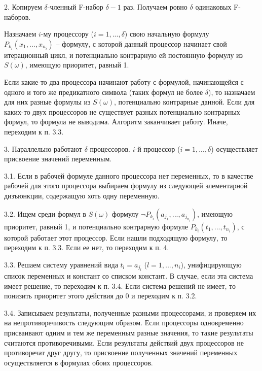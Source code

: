 \documentclass{spisok-article}
\begin{document}
2. Копируем $\delta$-членный F-набор $\delta -1$ раз. Получаем ровно $\delta$ одинаковых F-наборов.

Назначаем $i$-му процессору ($i=1,...,\delta$) свою начальную формулу  $P_{k_i}( x_1, ..., x_{n_i})$ -- формулу, с которой данный процессор начинает свой итерационный цикл, и потенциально контрарную ей постоянную формулу из $S(\omega)$, имеющую приоритет, равный 1.

Если какие-то два процессора начинают работу с формулой, начинающейся с одного и того же предикатного символа  (таких формул не более $\delta$), то назначаем для них разные формулы  из $S(\omega)$, потенциально контрарные данной. Если для каких-то двух процессоров не существует разных потенциально контрарных формул, то формула не выводима. Алгоритм заканчивает работу. Иначе, переходим к п. 3.3.

3. Параллельно работают $\delta$ процессоров. $i$-й процессор ($i=1,...,\delta$) осуществляет присвоение значений переменным.

\hspace*{12pt}
 3.1. Если в рабочей формуле данного процессора нет переменных, то в качестве рабочей для этого процессора выбираем  формулу из следующей элементарной дизъюнкции, содержащую хоть одну переменную.


\hspace*{12pt}
 3.2. Ищем среди формул в $ S(\omega)$ формулу $\lnot P_{k_i}( a_{j_1}, ..., a_{j_{n_i}})$, имеющую приоритет, равный 1, и потенциально контрарную формуле $P_{k_i}( t_1, ..., t_{n_i})$, с которой работает этот процессор.  Если нашли подходящую формулу, то переходим к п. 3.3. Если ее нет, то переходим к п. 4.

\hspace*{12pt} 3.3. Решаем систему уравнений вида $t_l = a_{j_l}$  ($l=1,...,n_i$), унифицирующую список переменных и констант  со списком констант. В случае, если эта система имеет решение, то переходим к п. 3.4. Если система решений не имеет, то понизить приоритет этого действия до 0 и переходим к п. 3.2.  \

\hspace*{12pt} 3.4. Записываем результаты, полученные разными процессорами, и проверяем их на непротиворечивость следующим образом. Если процессоры одновременно присваивают одним и тем же переменным разные значения, то такие результаты считаются противоречивыми. Если результаты действий двух процессоров не противоречат друг другу, то присвоение полученных значений переменных осуществляется в формулах обоих процессоров.  \
\end{document}
